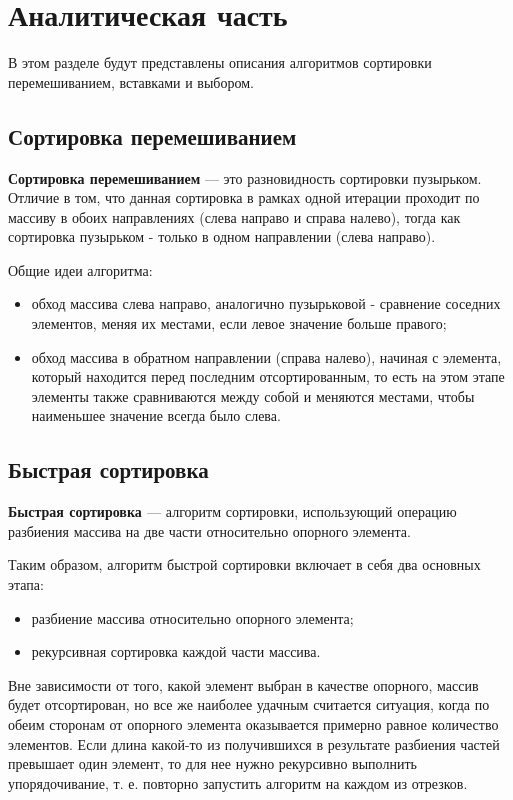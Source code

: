 \chapter{Аналитическая часть}
В этом разделе будут представлены описания алгоритмов сортировки перемешиванием, вставками и выбором.

\section{Сортировка перемешиванием}

\textbf{Сортировка перемешиванием} \cite{sheyker} — это разновидность сортировки пузырьком. Отличие в том, что данная сортировка в рамках одной итерации проходит по массиву в обоих направлениях (слева направо и справа налево), тогда как сортировка пузырьком - только в одном направлении (слева направо).

Общие идеи алгоритма:
\begin{itemize}
	\item обход массива слева направо, аналогично пузырьковой - сравнение соседних элементов, меняя их местами, если левое значение больше правого;
	\item обход массива в обратном направлении (справа налево), начиная с элемента, который находится перед последним отсортированным, то есть на этом этапе элементы также сравниваются между собой и меняются местами, чтобы наименьшее значение всегда было слева.
\end{itemize}


\section{Быстрая сортировка}

\textbf{Быстрая сортировка \cite{quick}} — алгоритм сортировки, использующий операцию разбиения массива на две части относительно опорного элемента.

Таким образом, алгоритм быстрой сортировки включает в себя два основных этапа:
\begin{itemize}
	\item разбиение массива относительно опорного элемента;
	\item рекурсивная сортировка каждой части массива.
\end{itemize}

Вне зависимости от того, какой элемент выбран в качестве опорного, массив будет отсортирован, но все же наиболее удачным считается ситуация, когда по обеим сторонам от опорного элемента оказывается примерно равное количество элементов. Если длина какой-то из получившихся в результате разбиения частей превышает один элемент, то для нее нужно рекурсивно выполнить упорядочивание, т. е. повторно запустить алгоритм на каждом из отрезков.


